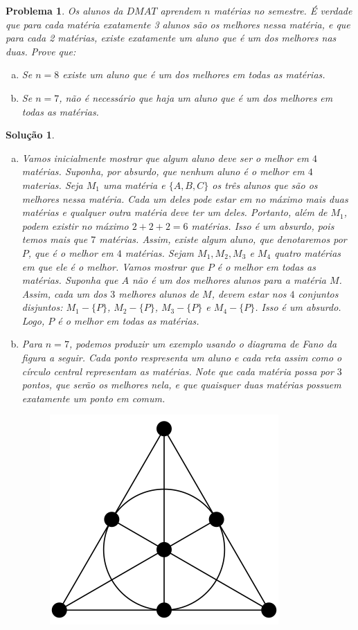 \documentclass{hipatia}
\newtheorem{problem*}{Problema}
\newtheorem*{solution*}{Solução}
\begin{document}
\begin{problem*}
Os alunos da $DMAT$ aprendem $n$ matérias no semestre. É verdade que para cada matéria exatamente 3 alunos são os melhores nessa matéria, e que para cada 2 matérias, existe exatamente um aluno que é um dos melhores nas duas.
Prove que:
\begin{enumerate}[a)]
\item Se $n=8$ existe um aluno que é um dos melhores em todas as matérias.
\item Se $n=7$, não é necessário que haja um aluno que é um dos melhores em todas as matérias. 
\end{enumerate}
\end{problem*}

\begin{solution*}
\begin{enumerate}[a)]
\item Vamos inicialmente mostrar que algum aluno deve ser o melhor em $4$ matérias. Suponha, por absurdo, que nenhum aluno é o melhor em $4$ materias. Seja $M_1$ uma matéria e $\{A,B,C\}$ os três alunos que são os melhores nessa matéria. Cada um deles pode estar em no máximo mais duas matérias e qualquer outra matéria deve ter um deles. Portanto, além de $M_1$, podem existir no máximo $2+2+2=6$ matérias. Isso é um absurdo, pois temos mais que $7$ matérias. Assim, existe algum aluno, que denotaremos por $P$, que é o melhor em $4$ matérias. Sejam $M_1, M_2, M_3$ e $M_4$ quatro matérias em que ele é o melhor. Vamos mostrar que $P$ é o melhor em todas as matérias. Suponha que $A$ não é um dos melhores alunos para a matéria $M$. Assim, cada um dos $3$ melhores alunos de $M$, devem estar nos $4$ conjuntos disjuntos: $M_1-\{P\}$, $M_2-\{P\}$, $M_3-\{P\}$ e $M_4-\{P\}$. Isso é um absurdo. Logo, $P$ é o melhor em todas as matérias. 
\item Para $n=7$, podemos produzir um exemplo usando o diagrama de Fano da figura a seguir. Cada ponto respresenta um aluno e cada reta assim como o círculo central representam as matérias. Note que cada matéria possa por $3$ pontos, que serão os melhores nela, e que quaisquer duas matérias possuem exatamente um ponto em comum.

\begin{figure}[H]
	\centering
		\includegraphics[scale=0.3]{fano.png}
\end{figure} 


\end{enumerate}
\end{solution*}
\end{document}
